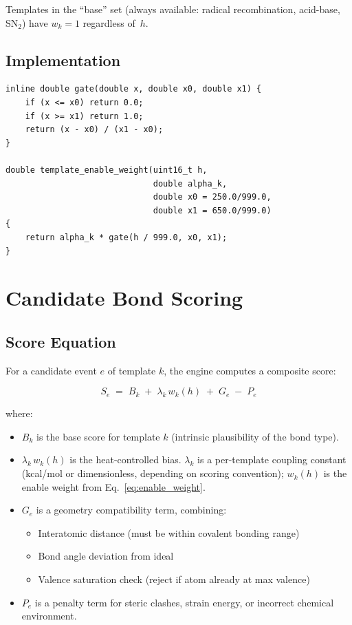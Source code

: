 \documentclass[11pt]{article}
\begin{document}
Templates in the ``base'' set (always available: radical recombination,
acid-base, SN$_2$) have $w_k = 1$ regardless of~$h$.

\subsection{Implementation}

\begin{lstlisting}
inline double gate(double x, double x0, double x1) {
    if (x <= x0) return 0.0;
    if (x >= x1) return 1.0;
    return (x - x0) / (x1 - x0);
}

double template_enable_weight(uint16_t h,
                              double alpha_k,
                              double x0 = 250.0/999.0,
                              double x1 = 650.0/999.0)
{
    return alpha_k * gate(h / 999.0, x0, x1);
}
\end{lstlisting}

\section{Candidate Bond Scoring}

\subsection{Score Equation}

For a candidate event $e$ of template $k$, the engine computes a composite
score:

\begin{equation}
\label{eq:score}
S_e \;=\; B_k \;+\; \lambda_k \, w_k(h) \;+\; G_e \;-\; P_e
\end{equation}

where:
\begin{itemize}
\item $B_k$ is the base score for template $k$ (intrinsic plausibility of
      the bond type).
\item $\lambda_k\, w_k(h)$ is the heat-controlled bias.  $\lambda_k$ is a
      per-template coupling constant (kcal/mol or dimensionless, depending
      on scoring convention); $w_k(h)$ is the enable weight from
      Eq.~\eqref{eq:enable_weight}.
\item $G_e$ is a geometry compatibility term, combining:
  \begin{itemize}
  \item Interatomic distance (must be within covalent bonding range)
  \item Bond angle deviation from ideal
  \item Valence saturation check (reject if atom already at max valence)
  \end{itemize}
\item $P_e$ is a penalty term for steric clashes, strain energy, or
      incorrect chemical environment.
\end{itemize}
\end{document}
